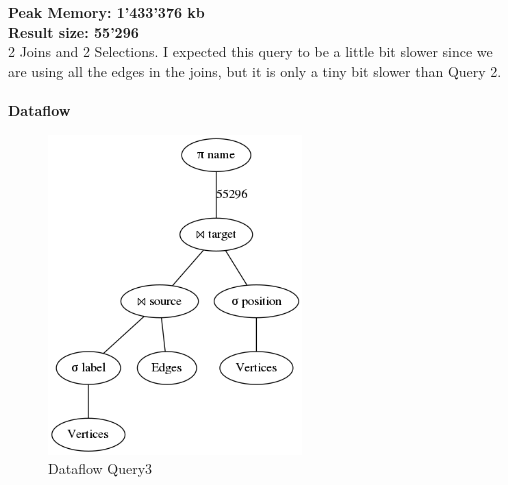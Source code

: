 \documentclass[11pt,singlecolumn]{scrartcl}
\begin{document}
\textbf{Peak Memory: 1'433'376 kb}\\
\textbf{Result size: 55'296}\\
2 Joins and 2 Selections. I expected this query to be a little bit slower since we are using all the edges in the joins, but it is only a tiny bit slower than Query 2.\\\\
\textbf{Dataflow}
\begin{figure}[H]
\includegraphics[width=0.6\textwidth]{graph3}
\caption{Dataflow Query3}
\end{figure}
\clearpage
\end{document}
